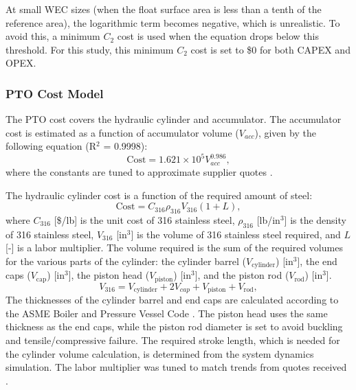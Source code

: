 \documentclass[a4paper,12pt]{elsarticle}
\begin{document}
At small WEC sizes (when the float surface area is less than a tenth of the reference area), the logarithmic term becomes negative, which is unrealistic. To avoid this, a minimum $C_2$ cost is used when the equation drops below this threshold. For this study, this minimum $C_2$ cost is set to \$0 for both CAPEX and OPEX.

\subsubsection{PTO Cost Model}
The PTO cost covers the hydraulic cylinder and accumulator. The accumulator cost is estimated as a function of accumulator volume ($V_{acc}$), given by the following equation (R$^2$ = 0.9998):
\begin{equation}
    \text{Cost} = 1.621 \times 10^5 V_{acc} ^{0.986},
\end{equation}
\noindent where the constants are tuned to approximate supplier quotes \cite{reasontek}. 

The hydraulic cylinder cost is a function of the required amount of steel:
\begin{equation}
    \text{Cost} = C_{\text{316}} \rho_{\text{316}} V_{\text{316}} (1+L),
\end{equation}
\noindent where $C_{\text{316}}$ [\$/lb] is the unit cost of 316 stainless steel, $\rho_{\text{316}}$ [lb/in$^3$] is the density of 316 stainless steel, $V_{\text{316}}$ [in$^3$] is the volume of 316 stainless steel required, and $L$ [-] is a labor multiplier. The volume required is the sum of the required volumes for the various parts of the cylinder: the cylinder barrel ($V_{\text{cylinder}}$) [in$^3$], the end caps ($V_{\text{cap}}$) [in$^3$], the piston head ($V_{\text{piston}}$) [in$^3$], and the piston rod ($V_{\text{rod}}$) [in$^3$]. %
\begin{equation}
    V_{\text{316}} = V_{\text{cylinder}} + 2V_{cap} + V_{\text{piston}} + V_{\text{rod}},
\end{equation}
The thicknesses of the cylinder barrel and end caps are calculated according to the ASME Boiler and Pressure Vessel Code \cite{ASME_BPVC}. The piston head uses the same thickness as the end caps, while the piston rod diameter is set to avoid buckling and tensile/compressive failure. The required stroke length, which is needed for the cylinder volume calculation, is determined from the system dynamics simulation. The labor multiplier was tuned to match trends from quotes received \cite{jit_industries}.
\end{document}
